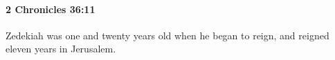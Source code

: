 
		\paragraph{2 Chronicles 36:11} %
			\label{2CHRONICLES-36-11}

			Zedekiah was one and twenty years old when he began to reign, and reigned eleven years in Jerusalem.


